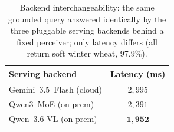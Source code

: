 \begin{table}[htbp]
\caption{Backend interchangeability: the same grounded query answered identically
by the three pluggable serving backends behind a fixed perceiver; only latency
differs (all return soft winter wheat, $97.9\%$).}
\label{tab:backend-switch}
\centering
\begin{tabular}{lc}
\toprule
\textbf{Serving backend} & \textbf{Latency (ms)} \\
\midrule
Gemini~3.5~Flash (cloud)      & $2{,}995$ \\
Qwen3~MoE (on-prem)        & $2{,}391$ \\
Qwen~3.6-VL (on-prem)         & $\mathbf{1{,}952}$ \\
\bottomrule
\end{tabular}
\end{table}
